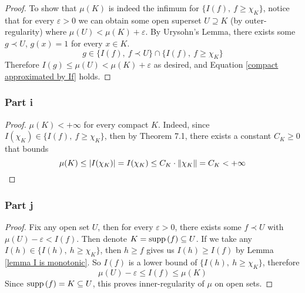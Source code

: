 \documentclass[../../main.tex]{subfiles}
\begin{document}
\begin{proof}
To show that $\mu(K)$ is indeed the infimum for $\{I(f),\: f\geq \chi_K\}$, notice that for every $\varepsilon>0$ we can obtain some open superset $U\supseteq K$ (by outer-regularity) where $\mu(U)<\mu(K)+\varepsilon$. By Urysohn's Lemma, there exists some $g\prec U$, $g(x)=1$ for every $x\in K$.
\[
g\in \{I(f),\: f\prec U\}\cap\{I(f),\: f\geq\chi_K\}
\]
Therefore $I(g)\leq\mu(U)<\mu(K)+\varepsilon$ as desired, and Equation \eqref{compact approximated by If} holds.
\end{proof}
\subsubsection*{Part i}
\begin{proof}
$\mu(K)<+\infty$ for every compact $K$. Indeed, since $I(\chi_K)\in\{I(f),\:f\geq\chi_K\}$, then by Theorem 7.1, there exists a constant $C_K\geq 0$ that bounds
\[
\mu(K)\leq |I(\chi_K)| = I(\chi_K)\leq C_K\cdot \lVert {\chi_K} \rVert = C_K<+\infty
\]
\end{proof}
\subsubsection*{Part j}
\begin{proof}
Fix any open set $U$, then for every $\varepsilon>0$, there exists some $f\prec U$ with $\mu(U)-\varepsilon<I(f)$. Then denote $K=\operatorname{supp}{(f)}\subseteq U$. If we take any $I(h)\in\{I(h),\:h\geq \chi_K\}$, then $h\geq f$ gives us $I(h)\geq I(f)$ by Lemma \ref{lemma I is monotonic}. So $I(f)$ is a lower bound of $\{I(h),\: h\geq \chi_K\}$, therefore
\[
\mu(U)-\varepsilon\leq I(f)\leq \mu(K)
\]
Since $\operatorname{supp}{(f)}=K\subseteq U$, this proves inner-regularity of $\mu$ on open sets.
\end{proof}
\end{document}
